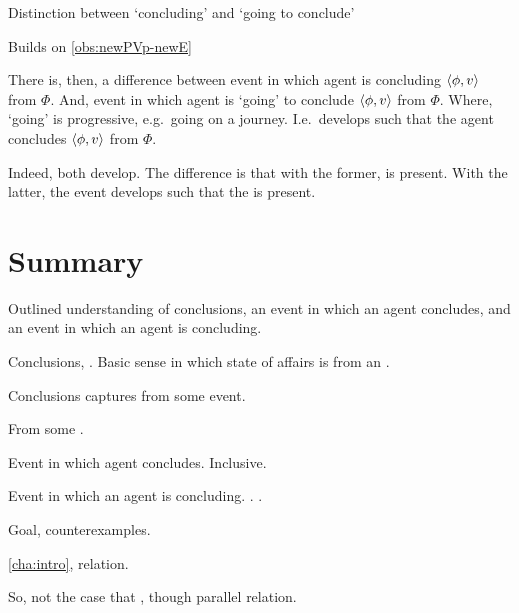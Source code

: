 \begin{note}
  \begin{observation}
    Distinction between `concluding' and `going to conclude'
  \end{observation}

  \begin{motivation}
    Builds on \autoref{obs:newPVp-newE}
  \end{motivation}
  {
    \color{red}
    There is, then, a difference between event in which agent is concluding \(\langle \phi, v \rangle\) from \(\Phi\).
    And, event in which agent is `going' to conclude \(\langle \phi, v \rangle\) from \(\Phi\).
    Where, `going' is progressive, e.g.\ going on a journey.
    I.e.\ develops such that the agent concludes \(\langle \phi, v \rangle\) from \(\Phi\).

    Indeed, both develop.
    The difference is that with the former, \pool{} is present.
    With the latter, the event develops such that the \pool{} is present.
  }
\end{note}

\section{Summary}
\label{cha:clar:sec:sum}

\begin{note}
  Outlined understanding of conclusions, an event in which an agent concludes, and an event in which an agent is concluding.
\end{note}

\begin{note}
  Conclusions, .
  Basic sense in which state of affairs is from an \agpe{}.

  Conclusions captures \evalN{} from some event.

  From some \pool{}.
\end{note}

\begin{note}
  Event in which agent concludes.
  Inclusive.
\end{note}

\begin{note}
  Event in which an agent is concluding.
  \assuPP{}.
  \pevent{}.
\end{note}

\begin{note}
  Goal, counterexamples.

  \autoref{cha:intro}, relation.

  So, not the case that \evalN{}, though parallel relation.
\end{note}


